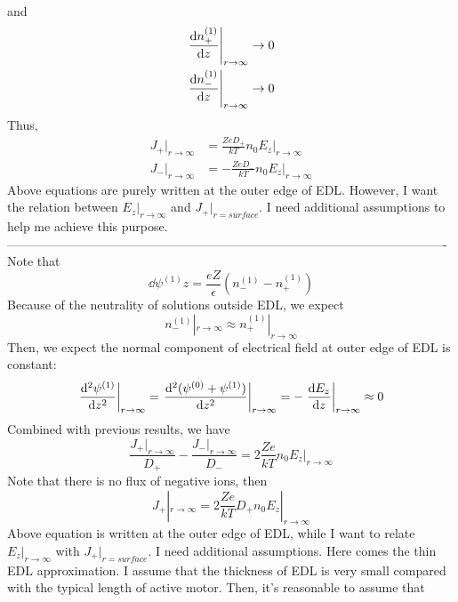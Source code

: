 \documentclass[fontsize=11pt, %
                             paper=a4, %
                             twoside, %
                             captions=tableheading,
                             index=totoc,
                             hyperref]{labbook}
\begin{document}
\begin{addmargin}[4cm]{0cm}
\begin{equation}
\begin{aligned}
\end{aligned}
\end{equation}
and
\begin{equation}
\begin{aligned}
\left.\frac{\mathrm{d} n_+^{(1)}}{\mathrm{d} z}\right|_{r\to\infty}\to 0\\
\left.\frac{\mathrm{d} n_-^{(1)}}{\mathrm{d} z}\right|_{r\to\infty}\to 0
\end{aligned}
\end{equation}
Thus,
\begin{equation}
\begin{aligned}
J_+|_{r\to\infty}&=\frac{ZeD_+}{kT}n_0E_z|_{r\to\infty}\\
J_-|_{r\to\infty}&=-\frac{ZeD_-}{kT}n_0E_z|_{r\to\infty}
\end{aligned}
\end{equation}
Above equations are purely written at the outer edge of EDL. However, I want the relation between $E_z|_{r\to\infty}$ and $J_+|_{r=surface}$. I need additional assumptions to help me achieve this purpose.\\
----------------------------------------------------------------------------------------------------------\\
Note that
\begin{equation}
\dd{\psi^{(1)}}{z}=\frac{eZ }{\epsilon}(n_-^{(1)}-n_+^{(1)})
\end{equation}
Because of the neutrality of solutions outside EDL, we expect 
\begin{equation}
n_-^{(1)}|_{r\to\infty}\approx n_+^{(1)}|_{r\to\infty}
\end{equation}
Then, we expect the normal component of electrical field at outer edge of EDL is constant:
\begin{equation}
\left.\frac{\mathrm{d}^2 \psi^{(1)}}{\mathrm{d} z^2}\right|_{r\to\infty}=\left.\frac{\mathrm{d}^2 (\psi^{(0)}+\psi^{(1)})}{\mathrm{d} z^2}\right|_{r\to\infty}=-\left.\frac{\mathrm{d} E_z}{\mathrm{d} z}\right|_{r\to\infty}\approx 0
\end{equation}
Combined with previous results, we have
\begin{equation}
\frac{J_+|_{r\to\infty}}{D_+}-\frac{J_-|_{r\to\infty}}{D_-}=2\frac{Ze}{kT}n_0E_z|_{r\to\infty}
\end{equation}
Note that there is no flux of negative ions, then
\begin{equation}
J_+|_{r\to\infty}=2\frac{Ze}{kT}D_+n_0E_z|_{r\to\infty}
\end{equation}
Above equation is written at the outer edge of EDL, while I want to relate $E_z|_{r\to\infty}$ with $J_+|_{r=surface}$. I need additional assumptions. Here comes the thin EDL approximation. I assume that the thickness of EDL is very small compared with the typical length of active motor. Then, it's reasonable to assume that

\end{addmargin}
\end{document}
